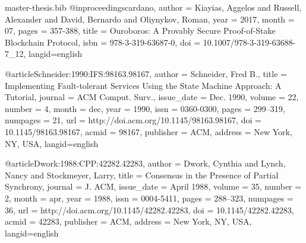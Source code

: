 \begin{filecontents}{master-thesis.bib}
@inproceedings{cardano,
author = {Kiayias, Aggelos and Russell, Alexander and David, Bernardo and Oliynykov, Roman},
year = {2017},
month = {07},
pages = {357-388},
title = {Ouroboros: A Provably Secure Proof-of-Stake Blockchain Protocol},
isbn = {978-3-319-63687-0},
doi = {10.1007/978-3-319-63688-7_12},
 langid={english}
}

@article{Schneider:1990:IFS:98163.98167,
 author = {Schneider, Fred B.},
 title = {Implementing Fault-tolerant Services Using the State Machine Approach: A Tutorial},
 journal = {ACM Comput. Surv.},
 issue_date = {Dec. 1990},
 volume = {22},
 number = {4},
 month = dec,
 year = {1990},
 issn = {0360-0300},
 pages = {299--319},
 numpages = {21},
 url = {http://doi.acm.org/10.1145/98163.98167},
 doi = {10.1145/98163.98167},
 acmid = {98167},
 publisher = {ACM},
 address = {New York, NY, USA},
  langid={english}
} 

@article{Dwork:1988:CPP:42282.42283,
 author = {Dwork, Cynthia and Lynch, Nancy and Stockmeyer, Larry},
 title = {Consensus in the Presence of Partial Synchrony},
 journal = {J. ACM},
 issue_date = {April 1988},
 volume = {35},
 number = {2},
 month = apr,
 year = {1988},
 issn = {0004-5411},
 pages = {288--323},
 numpages = {36},
 url = {http://doi.acm.org/10.1145/42282.42283},
 doi = {10.1145/42282.42283},
 acmid = {42283},
 publisher = {ACM},
 address = {New York, NY, USA},
  langid={english}
} 
\end{filecontents}